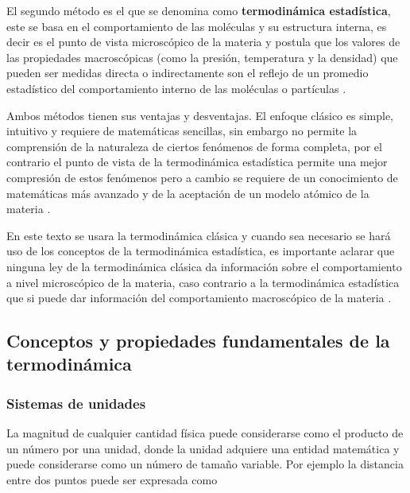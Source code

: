 \documentclass[master.tex]{subfiles}
\begin{document}
    El segundo método es el que se denomina como \textbf{termodinámica estadística}, este se basa en el comportamiento de las moléculas y su estructura interna, es decir es el punto de vista microscópico de la materia y postula que los valores de las propiedades macroscópicas (como la presión, temperatura y la densidad) que pueden ser medidas directa o indirectamente son el reflejo de un promedio estadístico del comportamiento interno de las moléculas o partículas \parencites{faires}{wark}.

    Ambos métodos tienen sus ventajas y desventajas. El enfoque clásico es simple, intuitivo y requiere de matemáticas sencillas, sin embargo no permite la comprensión de la naturaleza de ciertos fenómenos de forma completa, por el contrario el punto de vista de la termodinámica estadística permite una mejor compresión de estos fenómenos pero a cambio se requiere de un conocimiento de matemáticas más avanzado y de la aceptación de un modelo atómico de la materia \parencite{faires}. 

    En este texto se usara la termodinámica clásica y cuando sea necesario se hará uso de los conceptos de la termodinámica estadística, es importante aclarar que ninguna ley de la termodinámica clásica da información sobre el comportamiento a nivel microscópico de la materia, caso contrario a la termodinámica estadística que si puede dar información del comportamiento macroscópico de la materia \parencite{smith-vanness}.

    \subsection{Conceptos y propiedades fundamentales de la termodinámica}

    \subsubsection{Sistemas de unidades}

    La magnitud de cualquier cantidad física puede considerarse como el producto de un número por una unidad, donde la unidad adquiere una entidad matemática y puede considerarse como un número de tamaño variable. Por ejemplo la distancia entre dos puntos puede ser expresada como 

\printbibliography[title=Bibliografía del capítulo]
    
\end{document}

